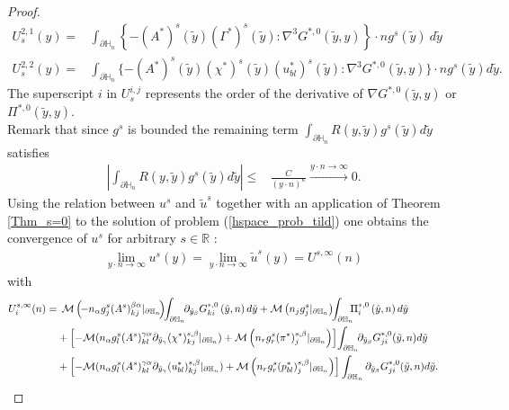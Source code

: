 \documentclass[11pt, reqno]{amsart}
\theoremstyle{definition}
\theoremstyle{remark}
\numberwithin{equation}{section}
\begin{document}
\begin{proof}
\begin{align*}
	U_s^{2,1}(y)=&\int_{\partial\mathbb{H}_n}  \left\{-(A^*)^s(\tilde{y}) (\Gamma^*)^s\left(\tilde{y}\right):\nabla^3 G^{*,0}\left(\tilde{y},y \right) 	\right\}\cdot n g^s(\tilde{y})   \  d\tilde{y}   \\
	U_s^{2,2}(y)=&\int_{\partial\mathbb{H}_n}  \{-(A^*)^s(\tilde{y}) (\chi^*)^s\left(\tilde{y} \right) (u_{bl}^*)^s\left(\tilde{y} \right):\nabla^3 G^{*,0}\left(\tilde{y},y \right) \}\cdot n g^s(\tilde{y})     d\tilde{y}.
\end{align*}
The superscript $i$ in $U_s^{i,j}$ represents the order of the derivative of $\nabla G^{*,0}(\tilde{y}, y)$ or $\Pi^{*,0}( \tilde{y}, y)$.\\

\noindent Remark that since $g^s$ is bounded the remaining term $ \int_{\partial\mathbb{H}_n} R(y,\tilde{y}) g^s(\tilde{y}) d\tilde{y}$
satisfies 
\begin{align*}
	\left| \int_{\partial\mathbb{H}_n} R(y,\tilde{y}) g^s(\tilde{y})d\tilde{y} \right|  \leq& \frac{C}{(y\cdot n)^\kappa} \stackrel{y\cdot n \rightarrow \infty}{ \longrightarrow } 0.
\end{align*}
Using the relation between $u^s$ and $\tilde{u}^s$ together with an application of Theorem \ref{Thm_s=0} to the solution of problem (\ref{hspace_prob_tild})  one obtains the convergence of $u^s$ for  arbitrary  $s\in\mathbb{R}$  :
\begin{align}
	\lim_{y\cdot n \rightarrow \infty} u^s(y)=\lim_{y\cdot n \rightarrow \infty} \tilde{u}^s(y)=  U^{s,\infty}(n)
\end{align}	
with
\begin{align*}
	U_i^{s,\infty}(n)
	=&\:	\: \mathcal{M} \left(\! - n_\alpha g^s_j (A^s)^{\beta\alpha}_{kj} |_{\partial\mathbb{H}_n} \! \right)\!\!\int_{\partial\mathbb{H}_n}\!\! \partial_{\tilde{y}_\beta} G^{*,0}_{ki} \left(\tilde{y},n\right) d\tilde{y}+  \mathcal{M} \left( n_j g^s_j|_{\partial\mathbb{H}_n} \right)\!\!\int_{\partial\mathbb{H}_n}\!\!\! \Pi^{*,0}_i\left(\tilde{y},n\right) d\tilde{y}\\
	&+\left[-\mathcal{M}(n_\alpha g^s_l (A^s)^{\gamma\alpha}_{kl}\partial_{ \tilde{y}_\gamma}  (\chi^*)_{kj}^{s,\beta}|_{\partial\mathbb{H}_n}) + \mathcal{M}\left( n_r g^s_r (\pi^*)_{j}^{s,\beta} |_{\partial\mathbb{H}_n} \right) \right]\!
	\int_{\partial\mathbb{H}_n}\!\!\partial_{\tilde{y}_\beta} G^{*,0}_{ji}(\tilde{y},n) d\tilde{y} \\
	&+ \left[ -\mathcal{M}(n_\alpha g^s_l (A^s)^{\gamma\alpha}_{kl}\partial_{ \tilde{y}_\gamma}  (u^*_{bl})_{kj}^{s,\beta}|_{\partial\mathbb{H}_n})+
	\mathcal{M}\left( n_r g^s_r( p_{bl}^*)_{j}^{s,\beta} |_{\partial\mathbb{H}_n} \right) \right]
	\int_{\partial\mathbb{H}_n}  \partial_{\tilde{y}_\beta}G^{*,0}_{ji}(\tilde{y},n) d\tilde{y}.\qquad\qedhere\\
\end{align*}	
\end{proof}
\end{document}
